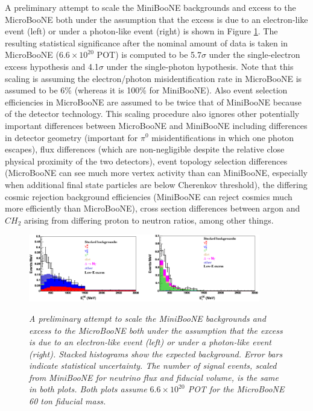 A preliminary attempt to scale the MiniBooNE backgrounds and excess to the MicroBooNE both under the assumption that the excess is due to an electron-like event (left) or under a photon-like event (right) \cite{UBTDR} is shown in Figure \ref{TDR_LEE_scaling_fig}. The resulting statistical significance after the nominal amount of data is taken in MicroBooNE ($6.6\times 10^20$ POT) is computed to be 5.7$\sigma$ under the single-electron excess hypothesis and 4.1$\sigma$ under the single-photon hypothesis. Note that this scaling is assuming the electron/photon misidentification rate in MicroBooNE is assumed to be 6\% (whereas it is 100\% for MiniBooNE). Also event selection efficiencies in MicroBooNE are assumed to be twice that of MiniBooNE because of the detector technology. This scaling procedure also ignores other potentially important differences between MicroBooNE and MiniBooNE including differences in detector geometry (important for $\pi^0$ misidentifications in which one photon escapes), flux differences (which are non-negligible despite the relative close physical proximity of the two detectors), event topology selection differences (MicroBooNE can see much more vertex activity than can MiniBooNE, especially when additional final state particles are below Cherenkov threshold), the differing cosmic rejection background efficiencies (MiniBooNE can reject cosmics much more efficiently than MicroBooNE), cross section differences between argon and $CH_2$ arising from differing proton to neutron ratios, among other things.\\

\begin{figure}[ht!]
\centering
	\includegraphics[width=0.9\textwidth]{Figures/TDR_LEE_scaling.png} \\
\caption{\textit{A preliminary attempt to scale the MiniBooNE backgrounds and excess to the MicroBooNE both under the assumption that the excess is due to an electron-like event (left) or under a photon-like event (right). Stacked histograms show the expected background. Error bars indicate statistical uncertainty. The number of signal events, scaled from MiniBooNE for neutrino flux and fiducial volume, is the same in both plots. Both plots assume $6.6 \times 10^20$ POT for the MicroBooNE 60 ton fiducial mass.}}\label{TDR_LEE_scaling_fig}
\end{figure}

